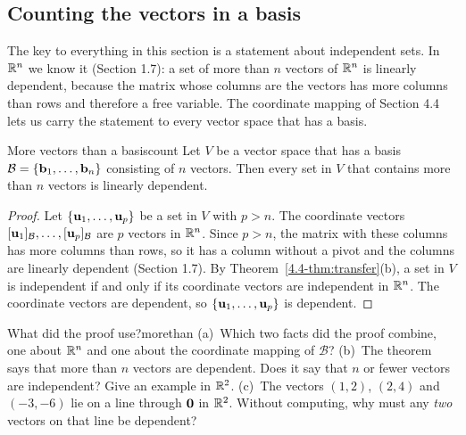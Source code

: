 \documentclass[11pt]{article}
\begin{document}
\subsection*{Counting the vectors in a basis}

The key to everything in this section is a statement about independent sets. In $\mathbb{R}^n$ we know it (Section 1.7): a set of more than $n$ vectors of $\mathbb{R}^n$ is linearly dependent, because the matrix whose columns are the vectors has more columns than rows and therefore a free variable. The coordinate mapping of Section 4.4 lets us carry the statement to every vector space that has a basis.

\begin{thm}{More vectors than a basis}{count}
Let $V$ be a vector space that has a basis $\mathcal{B}=\{\mathbf{b}_1,\dots,\mathbf{b}_n\}$ consisting of $n$ vectors. Then every set in $V$ that contains more than $n$ vectors is linearly dependent.
\end{thm}

\begin{proof}
Let $\{\mathbf{u}_1,\dots,\mathbf{u}_p\}$ be a set in $V$ with $p>n$. The coordinate vectors $[\mathbf{u}_1]_{\mathcal{B}},\dots,[\mathbf{u}_p]_{\mathcal{B}}$ are $p$ vectors in $\mathbb{R}^n$. Since $p>n$, the matrix with these columns has more columns than rows, so it has a column without a pivot and the columns are linearly dependent (Section 1.7). By Theorem~\ref{4.4-thm:transfer}(b), a set in $V$ is independent if and only if its coordinate vectors are independent in $\mathbb{R}^n$. The coordinate vectors are dependent, so $\{\mathbf{u}_1,\dots,\mathbf{u}_p\}$ is dependent.
\end{proof}

\begin{think}{What did the proof use?}{morethan}
(a)~Which two facts did the proof combine, one about $\mathbb{R}^n$ and one about the coordinate mapping of $\mathcal{B}$? (b)~The theorem says that more than $n$ vectors are dependent. Does it say that $n$ or fewer vectors are independent? Give an example in $\mathbb{R}^2$. (c)~The vectors $(1,2)$, $(2,4)$ and $(-3,-6)$ lie on a line through $\mathbf{0}$ in $\mathbb{R}^2$. Without computing, why must any \emph{two} vectors on that line be dependent?
\end{think}
\end{document}
